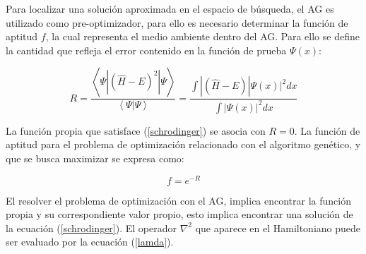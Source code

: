 Para localizar una soluci\'on aproximada en el espacio de
b\'usqueda, el AG es utilizado como pre-optimizador, para ello
es necesario determinar la funci\'on de aptitud $f$, la cual
representa el medio ambiente dentro del AG. Para ello se define la
cantidad que refleja el error contenido en la funci\'on de prueba
$\Psi(x)$:
	
\begin{equation}
	R=\frac{\left\langle\Psi|(\hat{H}-E)^2|\Psi\right\rangle}{\left\langle\Psi|\Psi\right\rangle}=\frac{\int|(\hat{H}-E)|\Psi(x)|^2 dx}{\int|\Psi(x)|^2 dx}
	\label{error}
\end{equation}    

La funci\'on propia que satisface (\ref{schrodinger}) se asocia con $R=0$.
La funci\'on de aptitud para el problema de optimizaci\'on relacionado
con el algoritmo gen\'etico, y que se busca maximizar se expresa como:

\begin{equation}
	f=e^{-R}
\end{equation}

El resolver el problema de optimizaci\'on con el AG,
implica encontrar la funci\'on propia y su correspondiente valor
propio, esto implica encontrar una soluci\'on de la ecuaci\'on
(\ref{schrodinger}). El operador $\nabla^2$ que aparece en el Hamiltoniano puede
ser evaluado por la ecuaci\'on (\ref{lamda}).
